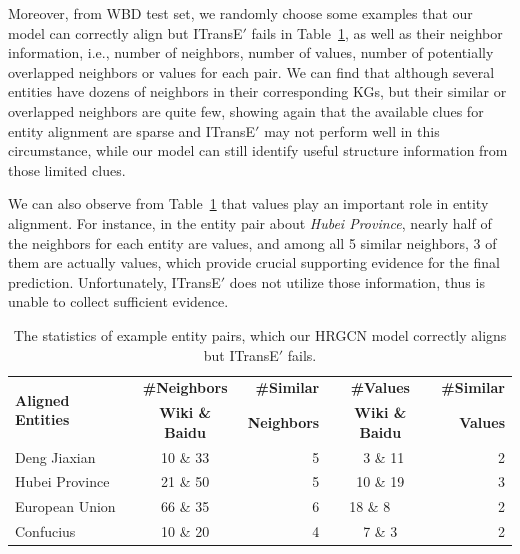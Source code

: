 Moreover, from WBD test set, we randomly choose some examples that our \HRGCN model can correctly align but ITransE$'$ fails in Table~\ref{example}, as well as their neighbor information, i.e., number of neighbors, number of values, number of potentially overlapped neighbors or values for each pair.
We can find that although several entities have dozens of neighbors in their corresponding KGs, but their similar or overlapped neighbors are quite few, showing again that
the available clues for entity alignment are sparse and ITransE$'$ may not perform well in this circumstance, while our \HRGCN model can still identify useful structure information from those limited clues.

We can also observe from Table~\ref{example} that values play an important role in entity alignment.
For instance, in the entity pair about \textit{Hubei Province}, nearly half of the neighbors for each entity are values, and among all 5 similar neighbors, 3 of them are actually values,
which provide crucial supporting evidence for the final prediction. Unfortunately, ITransE$'$ does not utilize those information, thus is unable to collect sufficient evidence.

\begin{table}
	\centering
	\scriptsize
	\begin{tabular}{lcrcr}
		\toprule
		\multirow{2}{*}{\bf Aligned Entities} & \bf \#Neighbors & \bf \#Similar & \bf \#Values & \bf \#Similar \\
		&\bf  Wiki \& Baidu &\bf  Neighbors &\bf  Wiki \& Baidu &\bf  Values \\
		\midrule
		Deng Jiaxian & 10 \& 33 & 5 & \ 3 \& 11 & 2\\
		Hubei Province & 21 \& 50 & 5 & 10 \& 19 & 3\\
		European Union & 66 \& 35 & 6 & 18 \& 8\ \ \ & 2\\
		Confucius & 10 \& 20 & 4 & 7 \& 3 & 2\\
		\bottomrule
	\end{tabular}
	\caption{The statistics of example entity pairs, which our HRGCN model correctly aligns but ITransE$'$ fails.}
	\label{example}
\end{table}


